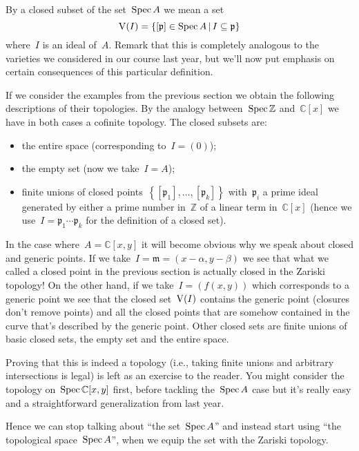 By a closed subset of the set~$\operatorname{Spec} A$ we mean a set
\begin{equation}
  \operatorname{V}(I)=\left\{ [\mathfrak{p}]\in\operatorname{Spec} A\,|\,I\subseteq\mathfrak{p} \right\}
\end{equation}
where~$I$ is an ideal of~$A$. Remark that this is completely analogous to the varieties we considered in our course last year, but we'll now put emphasis on certain consequences of this particular definition.

If we consider the examples from the previous section we obtain the following descriptions of their topologies. By the analogy between~$\operatorname{Spec}\mathbb{Z}$ and~$\mathbb{C}[x]$ we have in both cases a cofinite topology. The closed subsets are:
\begin{itemize}
  \item the entire space (corresponding to~$I=(0)$);
  \item the empty set (now we take~$I=A$);
  \item finite unions of closed points~$\left\{ [\mathfrak{p}_1],\ldots,[\mathfrak{p}_k] \right\}$ with~$\mathfrak{p}_i$ a prime ideal generated by either a prime number in~$\mathbb{Z}$ of a linear term in~$\mathbb{C}[x]$ (hence we use~$I=\mathfrak{p}_1\cdots\mathfrak{p}_k$ for the definition of a closed set).
\end{itemize}

In the case where~$A=\mathbb{C}[x,y]$ it will become obvious why we speak about closed and generic points. If we take~$I=\mathfrak{m}=(x-\alpha,y-\beta)$ we see that what we called a closed point in the previous section is actually closed in the Zariski topology! On the other hand, if we take~$I=(f(x,y))$ which corresponds to a generic point we see that the closed set~$\operatorname{V}(I)$ contains the generic point (closures don't remove points) and all the closed points that are somehow contained in the curve that's described by the generic point. Other closed sets are finite unions of basic closed sets, the empty set and the entire space.

Proving that this is indeed a topology (i.e., taking finite unions and arbitrary intersections is legal) is left as an exercise to the reader. You might consider the topology on~$\operatorname{Spec}\mathbb{C}[x,y]$ first, before tackling the~$\operatorname{Spec} A$ case but it's really easy and a straightforward generalization from last year.

Hence we can stop talking about ``the set~$\operatorname{Spec} A$'' and instead start using ``the topological space~$\operatorname{Spec} A$'', when we equip the set with the Zariski topology.


